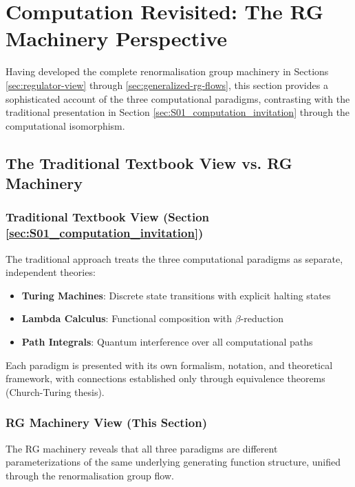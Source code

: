 
\section{Computation Revisited: The RG Machinery Perspective}
\label{sec:computation-revisited}

Having developed the complete renormalisation group machinery in Sections \ref{sec:regulator-view} through \ref{sec:generalized-rg-flows}, this section provides a sophisticated account of the three computational paradigms, contrasting with the traditional presentation in Section \ref{sec:S01_computation_invitation} through the computational isomorphism.

\subsection{The Traditional Textbook View vs. RG Machinery}

\subsubsection{Traditional Textbook View (Section \ref{sec:S01_computation_invitation})}

The traditional approach treats the three computational paradigms as separate, independent theories:
\begin{itemize}
\item \textbf{Turing Machines}: Discrete state transitions with explicit halting states
\item \textbf{Lambda Calculus}: Functional composition with $\beta$-reduction
\item \textbf{Path Integrals}: Quantum interference over all computational paths
\end{itemize}

Each paradigm is presented with its own formalism, notation, and theoretical framework, with connections established only through equivalence theorems (Church-Turing thesis).

\subsubsection{RG Machinery View (This Section)}

The RG machinery reveals that all three paradigms are different parameterizations of the same underlying generating function structure, unified through the renormalisation group flow.

